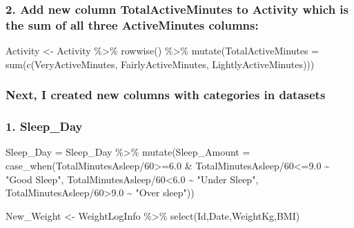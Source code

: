 \documentclass[
]{article}
\newenvironment{Shaded}{\begin{snugshade}}{\end{snugshade}}
\newcommand{\AttributeTok}[1]{\textcolor[rgb]{0.77,0.63,0.00}{#1}}
\newcommand{\DecValTok}[1]{\textcolor[rgb]{0.00,0.00,0.81}{#1}}
\newcommand{\FloatTok}[1]{\textcolor[rgb]{0.00,0.00,0.81}{#1}}
\newcommand{\FunctionTok}[1]{\textcolor[rgb]{0.00,0.00,0.00}{#1}}
\newcommand{\NormalTok}[1]{#1}
\newcommand{\OtherTok}[1]{\textcolor[rgb]{0.56,0.35,0.01}{#1}}
\newcommand{\SpecialCharTok}[1]{\textcolor[rgb]{0.00,0.00,0.00}{#1}}
\newcommand{\StringTok}[1]{\textcolor[rgb]{0.31,0.60,0.02}{#1}}
\begin{document}
\hypertarget{add-new-column-totalactiveminutes-to-activity-which-is-the-sum-of-all-three-activeminutes-columns}{%
\subsubsection{2. Add new column TotalActiveMinutes to Activity which is
the sum of all three ActiveMinutes
columns:}\label{add-new-column-totalactiveminutes-to-activity-which-is-the-sum-of-all-three-activeminutes-columns}}

\begin{Shaded}
\begin{Highlighting}[]
\NormalTok{Activity }\OtherTok{\textless{}{-}}\NormalTok{ Activity }\SpecialCharTok{\%\textgreater{}\%}
  \FunctionTok{rowwise}\NormalTok{() }\SpecialCharTok{\%\textgreater{}\%}
  \FunctionTok{mutate}\NormalTok{(}\AttributeTok{TotalActiveMinutes =} \FunctionTok{sum}\NormalTok{(}\FunctionTok{c}\NormalTok{(VeryActiveMinutes, FairlyActiveMinutes, LightlyActiveMinutes)))}
\end{Highlighting}
\end{Shaded}

\hypertarget{next-i-created-new-columns-with-categories-in-datasets}{%
\subsubsection{Next, I created new columns with categories in
datasets}\label{next-i-created-new-columns-with-categories-in-datasets}}

\hypertarget{sleep_day}{%
\subsubsection{1. Sleep\_Day}\label{sleep_day}}

\begin{Shaded}
\begin{Highlighting}[]
\NormalTok{Sleep\_Day }\OtherTok{=}\NormalTok{ Sleep\_Day }\SpecialCharTok{\%\textgreater{}\%} \FunctionTok{mutate}\NormalTok{(}\AttributeTok{Sleep\_Amount =} \FunctionTok{case\_when}\NormalTok{(TotalMinutesAsleep}\SpecialCharTok{/}\DecValTok{60}\SpecialCharTok{\textgreater{}=}\FloatTok{6.0} \SpecialCharTok{\&}\NormalTok{ TotalMinutesAsleep}\SpecialCharTok{/}\DecValTok{60}\SpecialCharTok{\textless{}=}\FloatTok{9.0}   \SpecialCharTok{\textasciitilde{}} \StringTok{"Good Sleep"}\NormalTok{,}
\NormalTok{    TotalMinutesAsleep}\SpecialCharTok{/}\DecValTok{60}\SpecialCharTok{\textless{}}\FloatTok{6.0} \SpecialCharTok{\textasciitilde{}} \StringTok{"Under Sleep"}\NormalTok{, }
\NormalTok{    TotalMinutesAsleep}\SpecialCharTok{/}\DecValTok{60}\SpecialCharTok{\textgreater{}}\FloatTok{9.0} \SpecialCharTok{\textasciitilde{}} \StringTok{"Over sleep"}\NormalTok{))}
    
\NormalTok{   New\_Weight }\OtherTok{\textless{}{-}}\NormalTok{ WeightLogInfo }\SpecialCharTok{\%\textgreater{}\%}
     \FunctionTok{select}\NormalTok{(Id,Date,WeightKg,BMI)}
\end{Highlighting}
\end{Shaded}
\end{document}
